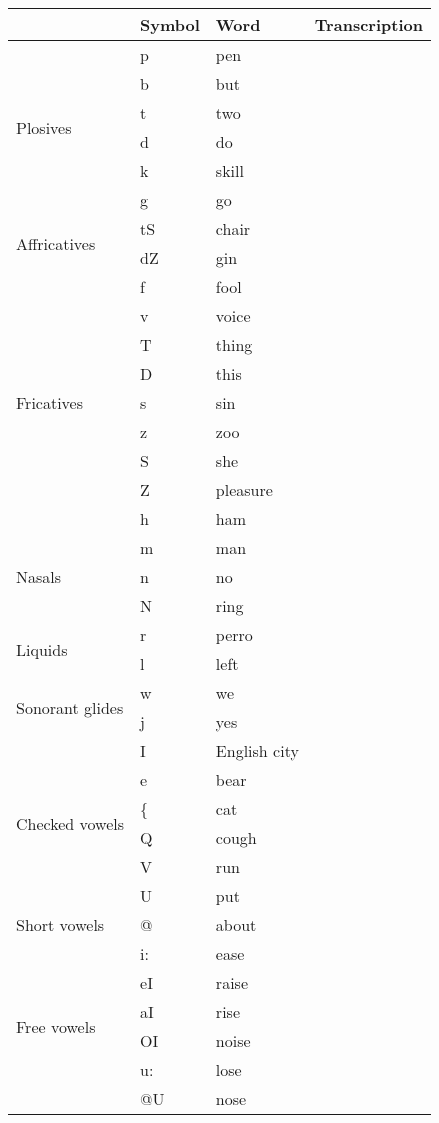 {\small
\begin{longtable}{l|l|p{.3\linewidth}|l}
	& Symbol & Word & Transcription\\
	\toprule
	\multirow{6}{*}{Plosives} &
	  p & pen &\\
	& b & but &\\
	& t & two &\\
	& d & do &\\
	& k & skill &\\
	& g & go &\\
	\midrule
	\multirow{2}{*}{Affricatives} &
	tS & chair &\\
	& dZ & gin &\\
	\midrule
	\multirow{9}{*}{Fricatives} &
		f & fool &\\
	& v & voice &\\
	& T & thing &\\
	& D & this &\\
	& s & sin &\\
	& z & zoo &\\
	& S & she &\\
	& Z & pleasure &\\
	& h & ham &\\
	\midrule
	\multirow{3}{*}{Nasals} &
	m & man &\\
	& n & no &\\
	& N & ring &\\
	\midrule
	\multirow{2}{*}{Liquids} &
	r & perro &\\
	& l & left &\\
	\midrule
	\multirow{2}{*}{Sonorant glides} &
	w & we &\\
	& j & yes &\\
	\midrule
	\multirow{6}{*}{Checked vowels} &
	I & English city &\\
	& e & bear &\\
	& \{ & cat &\\
	& Q & cough &\\
	& V & run &\\
	& U & put &\\
	\midrule
	\multirow{1}{*}{Short vowels} &
	@ & about &\\
	\midrule
	\multirow{13}{*}{Free vowels} &
	i: & ease &\\
	& eI & raise &\\
	& aI & rise &\\
	& OI & noise &\\
	& u: & lose &\\
	& @U & nose &\\

\end{longtable}}
